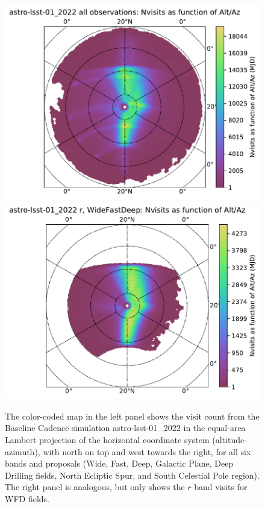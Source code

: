 \documentclass[DM,lsstdraft,authoryear,toc]{lsstdoc}
\begin{document}
\begin{figure}[t!]
\vskip -0.0in
\includegraphics[angle=0,width=0.49\hsize,clip]{figures/astro-lsst-01_2022_Nvisits_as_function_of_Alt_Az_all_observations_HEAL_SkyMap.pdf}
\includegraphics[angle=0,width=0.49\hsize,clip]{figures/astro-lsst-01_2022_Nvisits_as_function_of_Alt_Az_r_WideFastDeep_HEAL_SkyMap.pdf}
\vskip -0.1in
\caption{The color-coded map in the left panel shows the visit count from the
Baseline Cadence simulation astro-lsst-01\_2022 in the equal-area Lambert projection of the
horizontal coordinate system (altitude-azimuth), with north on top and west towards the
right, for all six bands and proposals (Wide, Fast, Deep, Galactic Plane, Deep Drilling
fields, North Ecliptic Spur, and South Celestial Pole region). The right panel is analogous,
but only shows the $r$ band visits for WFD fields.}
\label{fig:baseline_AltAz}
\end{figure}
\end{document}
